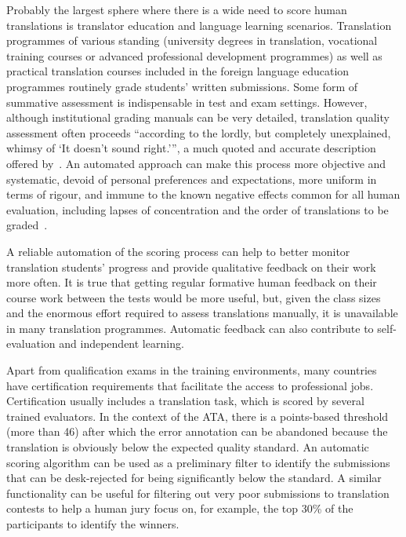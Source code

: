 Probably the largest sphere where there is a wide need to score human translations is translator education and language learning scenarios. Translation programmes of various standing (university degrees in translation, vocational training courses or advanced professional development programmes) as well as practical translation courses included in the foreign language education programmes routinely grade students' written submissions. Some form of summative assessment is indispensable in test and exam settings. However, although institutional grading manuals can be very detailed, translation quality assessment often proceeds ``according to the lordly, but completely unexplained, whimsy of `It doesn't sound right.''', a much quoted and accurate description offered by~\citet[p. 142]{Fawcett1981}. An automated approach can make this process more objective and systematic, devoid of personal preferences and expectations, more uniform in terms of rigour, and immune to the known negative effects common for all human evaluation, including lapses of concentration and the order of translations to be graded~\cite{MinacoriVibert2010}.    

A reliable automation of the scoring process can help to better monitor translation students' progress and provide qualitative feedback on their work more often. It is true that getting regular formative human feedback on their course work between the tests would be more useful, but, given the class sizes and the enormous effort required to assess translations manually, it is unavailable in many translation programmes.
Automatic feedback can also contribute to self-evaluation and independent learning. 

Apart from qualification exams in the training environments, many countries have certification requirements that facilitate the access to professional jobs. Certification usually includes a translation task, which is scored by several trained evaluators. In the context of the \gls{ATA}, there is a points-based threshold (more than 46) after which the error annotation can be abandoned because the translation is obviously below the expected quality standard. An automatic scoring algorithm can be used as a preliminary filter to identify the submissions that can be desk-rejected for being significantly below the standard. A similar functionality can be useful for filtering out very poor submissions to translation contests to help a human jury focus on, for example, the top 30\% of the participants to identify the winners. 

